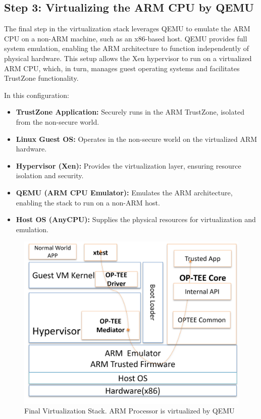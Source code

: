 \documentclass[acmtog]{acmart}
\begin{document}
\subsection{Step 3: Virtualizing the ARM CPU by QEMU}

The final step in the virtualization stack leverages QEMU to emulate the ARM CPU on a non-ARM machine, such as an x86-based host. QEMU provides full system emulation, enabling the ARM architecture to function independently of physical hardware. This setup allows the Xen hypervisor to run on a virtualized ARM CPU, which, in turn, manages guest operating systems and facilitates TrustZone functionality.

In this configuration:
\begin{itemize}
    \item \textbf{TrustZone Application:} Securely runs in the ARM TrustZone, isolated from the non-secure world.
    \item \textbf{Linux Guest OS:} Operates in the non-secure world on the virtualized ARM hardware.
    \item \textbf{Hypervisor (Xen):} Provides the virtualization layer, ensuring resource isolation and security.
    \item \textbf{QEMU (ARM CPU Emulator):} Emulates the ARM architecture, enabling the stack to run on a non-ARM host.
    \item \textbf{Host OS (AnyCPU):} Supplies the physical resources for virtualization and emulation.
\end{itemize}

\begin{figure}[ht]
  \centering
  \includegraphics[width=\columnwidth]{images/3.png}
  \caption{Final Virtualization Stack. ARM Processor is virtualized by QEMU}
  \label{fig:virtual_stack}
\end{figure}
\end{document}
